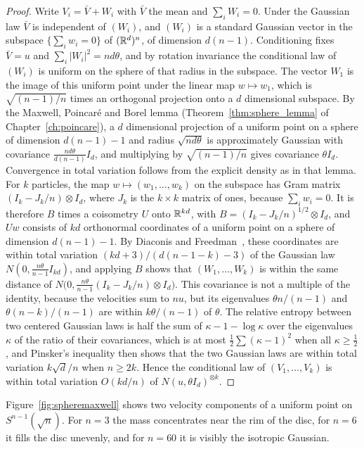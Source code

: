 \begin{proof}
Write $V_i = \bar V+W_i$ with $\bar V$ the mean and $\sum_iW_i = 0$. Under the Gaussian law $\bar V$ is independent of $(W_i)$, and $(W_i)$ is a standard Gaussian vector in the subspace $\{\sum_iw_i = 0\}$ of $(\mathbb{R}^d)^n$, of dimension $d(n-1)$. Conditioning fixes $\bar V = u$ and $\sum_i|W_i|^2 = nd\theta$, and by rotation invariance the conditional law of $(W_i)$ is uniform on the sphere of that radius in the subspace. The vector $W_1$ is the image of this uniform point under the linear map $w\mapsto w_1$, which is $\sqrt{(n-1)/n}$ times an orthogonal projection onto a $d$ dimensional subspace. By the Maxwell, Poincar\'e and Borel lemma (Theorem~\ref{thm:sphere_lemma} of Chapter~\ref{ch:poincare}), a $d$ dimensional projection of a uniform point on a sphere of dimension $d(n-1)-1$ and radius $\sqrt{nd\theta}$ is approximately Gaussian with covariance $\frac{nd\theta}{d(n-1)}I_d$, and multiplying by $\sqrt{(n-1)/n}$ gives covariance $\theta I_d$. Convergence in total variation follows from the explicit density as in that lemma. For $k$ particles, the map $w\mapsto(w_1,\dots,w_k)$ on the subspace has Gram matrix $(I_k-J_k/n)\otimes I_d$, where $J_k$ is the $k\times k$ matrix of ones, because $\sum_iw_i = 0$. It is therefore $B$ times a coisometry $U$ onto $\mathbb{R}^{kd}$, with $B = (I_k-J_k/n)^{1/2}\otimes I_d$, and $Uw$ consists of $kd$ orthonormal coordinates of a uniform point on a sphere of dimension $d(n-1)-1$. By Diaconis and Freedman~\cite{diaconisfreedman1987}, these coordinates are within total variation $(kd+3)/(d(n-1-k)-3)$ of the Gaussian law $N(0,\frac{n\theta}{n-1}I_{kd})$, and applying $B$ shows that $(W_1,\dots,W_k)$ is within the same distance of $N\big(0,\frac{n\theta}{n-1}(I_k-J_k/n)\otimes I_d\big)$. This covariance is not a multiple of the identity, because the velocities sum to $nu$, but its eigenvalues $\theta n/(n-1)$ and $\theta(n-k)/(n-1)$ are within $k\theta/(n-1)$ of $\theta$. The relative entropy between two centered Gaussian laws is half the sum of $\kappa-1-\log\kappa$ over the eigenvalues $\kappa$ of the ratio of their covariances, which is at most $\frac12\sum(\kappa-1)^2$ when all $\kappa\geq\frac12$, and Pinsker's inequality then shows that the two Gaussian laws are within total variation $k\sqrt d/n$ when $n\geq2k$. Hence the conditional law of $(V_1,\dots,V_k)$ is within total variation $O(kd/n)$ of $N(u,\theta I_d)^{\otimes k}$.
\end{proof}

Figure~\ref{fig:spheremaxwell} shows two velocity components of a uniform point on $S^{n-1}(\sqrt n)$. For $n = 3$ the mass concentrates near the rim of the disc, for $n = 6$ it fills the disc unevenly, and for $n = 60$ it is visibly the isotropic Gaussian.

